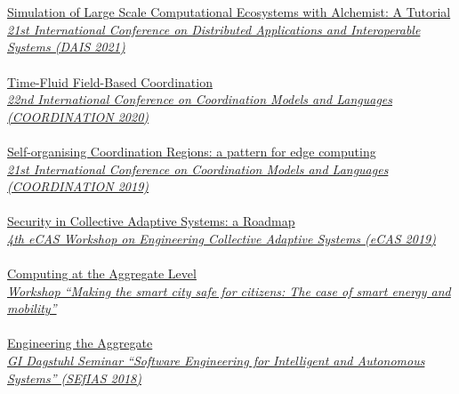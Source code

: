 \\ \halfblankline \\
\href{https://alchemistsimulator.github.io/tutorials/basics/index.html}{Simulation of Large Scale Computational Ecosystems with Alchemist: A Tutorial} \\
\href{https://www.discotec.org/2023/dais.html}{\textit{21st International Conference on Distributed Applications and Interoperable Systems (DAIS 2021)}}
\\ \halfblankline \\
\href{https://danysk.github.io/Slides-2020-Coordination-TimeFluid/}{Time-Fluid Field-Based Coordination} \\
\href{http://www.discotec.org/2020/coordination.html}{\textit{22nd International Conference on Coordination Models and Languages (COORDINATION 2020)}}
\\ \halfblankline \\
\href{https://danysk.github.io/Slides-2019-Coordination-SCR/}{Self-organising Coordination Regions: a pattern for edge computing} \\
\href{http://www.discotec.org/2019/coordination.html}{\textit{21st International Conference on Coordination Models and Languages (COORDINATION 2019)}}
\\ \halfblankline \\
\href{https://danysk.github.io/Slides-2019-eCAS-security/}{Security in Collective Adaptive Systems: a Roadmap} \\
\href{https://apice.unibo.it/xwiki/bin/view/ECAS2019/}{\textit{4th eCAS Workshop on Engineering Collective Adaptive Systems (eCAS 2019)}}
\\ \halfblankline \\
\href{https://danysk.github.io/Slides-2018-BISS/}{Computing at the Aggregate Level} \\
\href{https://www.biss-institute.com/wp-content/uploads/2018/07/For-more-information-download-the-brochure.pdf}{\textit{Workshop ``Making the smart city safe for citizens:
The case of smart energy and mobility''}}
\\ \halfblankline \\
\href{https://www.slideshare.net/DanySK/engineering-the-aggregate-talk-at-software-engineering-for-intelligent-and-autonomous-systems-sefias-dagstuhl-2018}{Engineering the Aggregate} \\
\href{https://www.hpi.uni-potsdam.de/giese/public/selfadapt/dagstuhl-seminars/sefias/}{\textit{GI Dagstuhl Seminar ``Software Engineering for Intelligent and Autonomous Systems'' (SEfIAS 2018)}}
